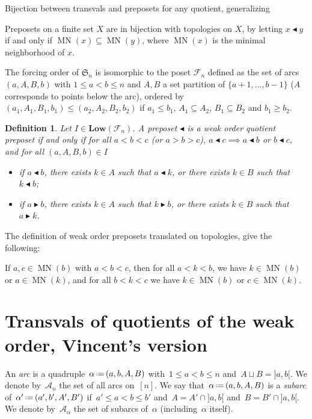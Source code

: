 \documentclass[leqno, 12pt]{amsart}
\numberwithin{equation}{section}
\newcommand{\Ss}{\mathfrak S}
\newcommand{\IdL}{\mathbf{Low}}
\newcommand{\MN}{\operatorname{MN}}
\newcommand{\forcingorder}{\mathcal F}
\newcommand{\darkblue}{\color{darkblue}} %
\newcommand{\defn}[1]{\textsl{\darkblue #1}} %
\newcommand{\eqdef}{\mbox{\,\raisebox{0.2ex}{\scriptsize\ensuremath{\mathrm:}}\ensuremath{=}\,}} %
\numberwithin{equation}{section}
\newtheorem{defi}[thm]{Definition}
\theoremstyle{remark}
\begin{document}
Bijection between transvals and preposets for any quotient, generalizing \cite{CPP19}

Preposets on a finite set $X$ are in bijection with topologies on $X$, by letting $x\blacktriangleleft y$ if and only if $\MN(x)\subseteq \MN(y)$, where $\MN(x)$ is the minimal neighborhood of $x$.

The forcing order of $\Ss_n$ is isomorphic to the poset $\forcingorder_n$ defined as the set of arcs $(a,A,B,b)$ with $1\le a < b\le n$ and $A,B$ a set partition of $\{a+1,\dots, b-1\}$ ($A$ corresponds to points below the arc), ordered by $(a_1,A_1,B_1,b_1) \le (a_2,A_2,B_2,b_2)$ if $a_1\le b_1$, $A_1\subseteq A_2$, $B_1\subseteq B_2$ and $b_1\ge b_2$.

\begin{defi}
Let $I\in \IdL(\forcingorder_n)$. A preposet $\blacktriangleleft$ is a weak order quotient preposet if and only if for all $a<b<c$ (or $a>b>c$), $a\blacktriangleleft c\implies a\blacktriangleleft b$ or $b\blacktriangleleft c$, and for all $(a,A,B,b)\in I$
\begin{itemize}
\item if $a\blacktriangleleft b$, there exists $k\in A$ such that $a\blacktriangleleft k$, or there exists $k\in B$ such that $k\blacktriangleleft b$;
\item if $a \blacktriangleright b$, there exists $k\in A$ such that $k\blacktriangleright b$, or there exists $k\in B$ such that $a\blacktriangleright k$.
\end{itemize}
\end{defi}

The definition of weak order preposets translated on topologies, give the following:

If $a,c\in \MN(b)$ with $a<b<c$, then for all $a<k<b$, we have $k\in \MN(b)$ or $a\in \MN(k)$, and for all $b<k<c$ we have $k\in \MN(b)$ or $c\in \MN(k)$.

\section{Transvals of quotients of the weak order, Vincent's version}

\newcommand{\arc}{\alpha}
\newcommand{\arcs}{\mathcal{A}}

An \defn{arc} is a quadruple~$\arc \eqdef (a, b, A, B)$ with~$1 \le a < b \le n$ and~$A \sqcup B = {]a,b[}$.
We denote by~$\arcs_n$ the set of all arcs on~$[n]$.
We say that~$\arc \eqdef (a, b, A, B)$ is a \defn{subarc} of~$\arc' \eqdef (a', b', A', B')$ if~$a' \le a < b \le b'$ and~$A = A' \cap {]a,b[}$ and~$B = B' \cap {]a,b[}$.
We denote by~$\arcs_{\arc}$ the set of subarcs of~$\arc$ (including~$\arc$ itself).
\end{document}
